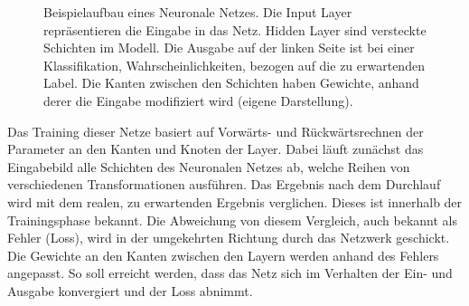 \def\layersep{2.5cm}
\begin{figure}[!b]\centering
  \vspace{-0.5cm}
\caption[Beispielaufbau eines Neuronale Netzes]{Beispielaufbau eines Neuronale Netzes. Die Input Layer repräsentieren die Eingabe in das Netz. Hidden Layer sind versteckte Schichten im Modell. Die Ausgabe auf der linken Seite ist bei einer Klassifikation, Wahrscheinlichkeiten, bezogen auf die zu erwartenden Label. Die Kanten zwischen den Schichten haben Gewichte, anhand derer die Eingabe modifiziert wird (eigene Darstellung).}\label{cap:neuralnet}
\end{figure}\label{fig:neuralnet}

Das Training dieser Netze basiert auf Vorwärts- und Rückwärtsrechnen der Parameter an den Kanten und Knoten der Layer. Dabei läuft zunächst das Eingabebild alle Schichten des Neuronalen Netzes ab, welche Reihen von verschiedenen Transformationen ausführen. Das Ergebnis nach dem Durchlauf wird mit dem realen, zu erwartenden Ergebnis verglichen. Dieses ist innerhalb der Trainingsphase bekannt. Die Abweichung von diesem Vergleich, auch bekannt als Fehler (Loss), wird in der umgekehrten Richtung durch das Netzwerk geschickt. Die Gewichte an den Kanten zwischen den Layern werden anhand des Fehlers angepasst. So soll erreicht werden, dass das Netz sich im Verhalten der Ein- und Ausgabe konvergiert und der Loss abnimmt.


